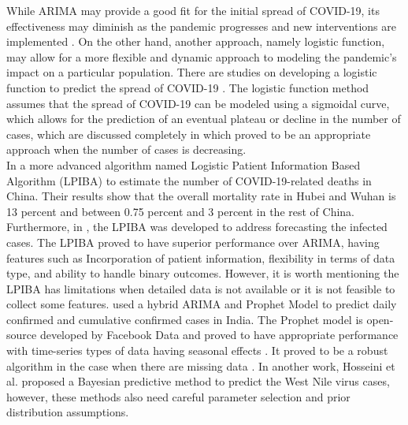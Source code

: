 \documentclass{article}
\begin{document}
While ARIMA may provide a good fit for the initial spread of COVID-19, its effectiveness may diminish as the pandemic progresses and new interventions are implemented \cite{hernandez2020forecasting}. On the other hand, another approach, namely logistic function, may allow for a more flexible and dynamic approach to modeling the pandemic's impact on a particular population. There are studies on developing a logistic function to predict the spread of COVID-19 \cite{roosa2020real}. The logistic function method assumes that the spread of COVID-19 can be modeled using a sigmoidal curve, which allows for the prediction of an eventual plateau or decline in the number of cases, which are discussed completely in \cite{chen2020reconstructing,li2020trend,qeadan2020naive} which proved to be an appropriate approach when the number of cases is decreasing.\\

In \cite{wang2020prediction} a more advanced algorithm named Logistic Patient Information Based Algorithm (LPIBA) to estimate the number of COVID-19-related deaths in China. Their results show that the overall mortality rate in Hubei and Wuhan is 13 percent and between 0.75 percent and 3 percent in the rest of China. Furthermore, in \cite{fathollahi2022sustainable}, the LPIBA was developed to address forecasting the infected cases. The LPIBA proved to have superior performance over ARIMA, having features such as Incorporation of patient information, flexibility in terms of data type, and ability to handle binary outcomes. However, it is worth mentioning the LPIBA has limitations when detailed data is not available or it is not feasible to collect some features. 
\cite{mohan2022predicting} used a hybrid ARIMA and Prophet Model to predict daily confirmed and cumulative confirmed cases in India. The Prophet model is open-source developed by Facebook Data and proved to have appropriate performance with time-series types of data having seasonal effects \cite{taylor2018forecasting,taylor2017prophet}. It proved to be a robust algorithm in the case when there are missing data \cite{ndiaye2020analysis}. In another work, Hosseini et al. proposed a Bayesian predictive method to predict the West Nile virus cases\cite{hosseini2024parsimonious}, however, these methods also need careful parameter selection and prior distribution assumptions.
\\
\end{document}
